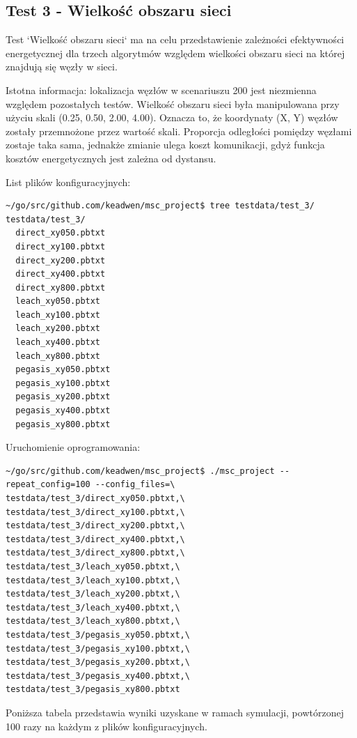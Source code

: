 \documentclass[a4paper,12pt,twoside,openany]{report}
\begin{document}
\subsection{Test 3 - Wielkość obszaru sieci}

Test `Wielkość obszaru sieci` ma na celu przedstawienie zależności efektywności energetycznej dla trzech algorytmów względem wielkości obszaru sieci na której
znajdują się węzły w sieci.

Istotna informacja: lokalizacja węzłów w scenariuszu 200 jest niezmienna względem pozostałych testów. Wielkość obszaru sieci była manipulowana przy użyciu skali (0.25, 0.50, 2.00, 4.00).
Oznacza to, że koordynaty (X, Y) węzłów zostały przemnożone przez wartość skali. Proporcja odległości pomiędzy węzłami zostaje taka sama, jednakże zmianie ulega koszt komunikacji, gdyż 
funkcja kosztów energetycznych jest zależna od dystansu.

List plików konfiguracyjnych:

\begin{lstlisting}
~/go/src/github.com/keadwen/msc_project$ tree testdata/test_3/
testdata/test_3/
  direct_xy050.pbtxt
  direct_xy100.pbtxt
  direct_xy200.pbtxt
  direct_xy400.pbtxt
  direct_xy800.pbtxt
  leach_xy050.pbtxt
  leach_xy100.pbtxt
  leach_xy200.pbtxt
  leach_xy400.pbtxt
  leach_xy800.pbtxt
  pegasis_xy050.pbtxt
  pegasis_xy100.pbtxt
  pegasis_xy200.pbtxt
  pegasis_xy400.pbtxt
  pegasis_xy800.pbtxt
\end{lstlisting}

Uruchomienie oprogramowania:

\begin{lstlisting}
~/go/src/github.com/keadwen/msc_project$ ./msc_project --repeat_config=100 --config_files=\
testdata/test_3/direct_xy050.pbtxt,\
testdata/test_3/direct_xy100.pbtxt,\
testdata/test_3/direct_xy200.pbtxt,\
testdata/test_3/direct_xy400.pbtxt,\
testdata/test_3/direct_xy800.pbtxt,\
testdata/test_3/leach_xy050.pbtxt,\
testdata/test_3/leach_xy100.pbtxt,\
testdata/test_3/leach_xy200.pbtxt,\
testdata/test_3/leach_xy400.pbtxt,\
testdata/test_3/leach_xy800.pbtxt,\
testdata/test_3/pegasis_xy050.pbtxt,\
testdata/test_3/pegasis_xy100.pbtxt,\
testdata/test_3/pegasis_xy200.pbtxt,\
testdata/test_3/pegasis_xy400.pbtxt,\
testdata/test_3/pegasis_xy800.pbtxt
\end{lstlisting}

Poniższa tabela przedstawia wyniki uzyskane w ramach symulacji, powtórzonej 100 razy na każdym z plików konfiguracyjnych. 
\end{document}
